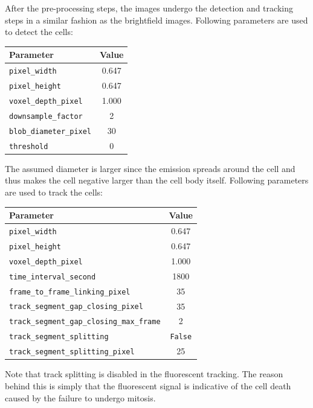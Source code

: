 \documentclass[pdftex,12pt,a4paper]{report}
\begin{document}
After the pre-processing steps, the images undergo the detection and tracking steps in a similar fashion as the brightfield images. Following parameters are used to detect the cells:

\begin{table}[H]
\centering
\begin{tabular}[t]{ l | c }
\hline
Parameter & Value \\
\hline\hline
\texttt{pixel\_width} & 0.647 \\
\texttt{pixel\_height} & 0.647 \\
\texttt{voxel\_depth\_pixel} & 1.000 \\
\texttt{downsample\_factor} & 2 \\
\texttt{blob\_diameter\_pixel} & 30 \\
\texttt{threshold} & 0 \\
\end{tabular}
\end{table}

The assumed diameter is larger since the emission spreads around the cell and thus makes the cell negative larger than the cell body itself. Following parameters are used to track the cells:

\begin{table}[H]
\centering
\begin{tabular}[t]{ l | c }
\hline
Parameter & Value \\
\hline\hline
\texttt{pixel\_width} & 0.647 \\
\texttt{pixel\_height} & 0.647 \\
\texttt{voxel\_depth\_pixel} & 1.000 \\
\texttt{time\_interval\_second} & 1800\\
\texttt{frame\_to\_frame\_linking\_pixel} & 35 \\
\texttt{track\_segment\_gap\_closing\_pixel} & 35 \\
\texttt{track\_segment\_gap\_closing\_max\_frame} & 2 \\
\texttt{track\_segment\_splitting} & \texttt{False} \\
\texttt{track\_segment\_splitting\_pixel} & 25 \\
\end{tabular}
\end{table}

Note that track splitting is disabled in the fluorescent tracking. The reason behind this is simply that the fluorescent signal is indicative of the cell death caused by the failure to undergo mitosis.
\end{document}
